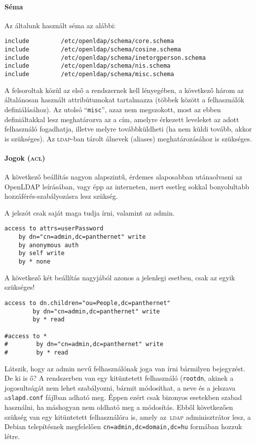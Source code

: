 \paragraph{Séma} Az általunk használt séma az alábbi:

\begin{Verbatim}[frame=single]
include         /etc/openldap/schema/core.schema
include         /etc/openldap/schema/cosine.schema
include         /etc/openldap/schema/inetorgperson.schema
include         /etc/openldap/schema/nis.schema
include         /etc/openldap/schema/misc.schema
\end{Verbatim}
  
A felsoroltak közül az első a rendszernek kell lényegében, a következő három az általánosan használt attribútumokat tartalmazza
(többek között a felhasználók definiálásához). Az utolsó ``\texttt{misc}'', azaz nem megszokott, most az ebben
definiáltakkal lesz meghatározva az a cím, amelyre érkezett leveleket az adott felhasználó fogadhatja, illetve melyre
továbbküldheti (ha nem küldi tovább, akkor is szükséges). Az \textsc{ldap}-ban tárolt álnevek (aliases) meghatározásához is
szükséges.

\paragraph{Jogok (\textsc{acl})} A következő beállítás nagyon alapszintű, érdemes alaposabban utánaolvasni az OpenLDAP
leírásában, vagy épp az interneten, mert esetleg sokkal bonyolultabb hozzáférés-szabályozásra lesz szükség.

A jelszót csak saját maga tudja írni, valamint az admin.

\begin{Verbatim}[frame=single]
access to attrs=userPassword
    by dn="cn=admin,dc=panthernet" write
    by anonymous auth
    by self write
    by * none
\end{Verbatim}    

A következő két beállítás nagyjából azonos a jelenlegi esetben, csak az egyik szükséges!

\begin{Verbatim}[frame=single]
access to dn.children="ou=People,dc=panthernet"
        by dn="cn=admin,dc=panthernet" write
        by * read

#access to *
#        by dn="cn=admin,dc=panthernet" write
#        by * read
\end{Verbatim}


Látszik, hogy az admin nevű felhasználónak joga van írni bármilyen bejegyzést. De ki is ő? A rendszerben van egy
kitüntetett felhasználó (\texttt{rootdn}, akinek a jogosultságát nem lehet szabályozni, bármit módosíthat, a
neve és a jelszava a\texttt{slapd.conf} fájlban adható meg. Éppen ezért csak bizonyos esetekben szabad használni, ha
máshogyan nem oldható meg a módosítás. Ebből következően szükség van egy kitüntetett felhasználóra is, amely az~\textsc{ldap}
adminisztrátor lesz, a Debian telepítésnek megfelelően \texttt{cn=admin,dc=domain,dc=hu} formában hozzuk létre.


